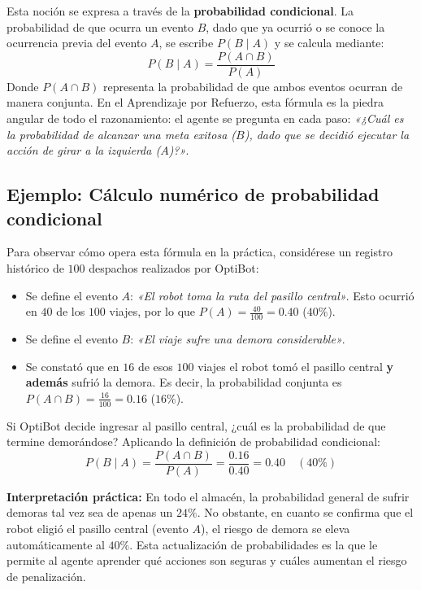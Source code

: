 Esta noción se expresa a través de la \textbf{probabilidad condicional}. La probabilidad de que ocurra un evento $B$, dado que ya ocurrió o se conoce la ocurrencia previa del evento $A$, se escribe $P(B \mid A)$ y se calcula mediante:
\begin{equation}
  P(B \mid A) = \frac{P(A \cap B)}{P(A)}
\end{equation}
Donde $P(A \cap B)$ representa la probabilidad de que ambos eventos ocurran de manera conjunta. En el Aprendizaje por Refuerzo, esta fórmula es la piedra angular de todo el razonamiento: el agente se pregunta en cada paso: \textit{«¿Cuál es la probabilidad de alcanzar una meta exitosa ($B$), dado que se decidió ejecutar la acción de girar a la izquierda ($A$)?»}.

\subsection*{Ejemplo: Cálculo numérico de probabilidad condicional}
Para observar cómo opera esta fórmula en la práctica, considérese un registro histórico de $100$ despachos realizados por OptiBot:
\begin{itemize}
  \item Se define el evento $A$: \textit{«El robot toma la ruta del pasillo central»}. Esto ocurrió en $40$ de los $100$ viajes, por lo que $P(A) = \frac{40}{100} = 0.40$ ($40\%$).
  \item Se define el evento $B$: \textit{«El viaje sufre una demora considerable»}.
  \item Se constató que en $16$ de esos $100$ viajes el robot tomó el pasillo central \textbf{y además} sufrió la demora. Es decir, la probabilidad conjunta es $P(A \cap B) = \frac{16}{100} = 0.16$ ($16\%$).
\end{itemize}

Si OptiBot decide ingresar al pasillo central, ¿cuál es la probabilidad de que termine demorándose? Aplicando la definición de probabilidad condicional:
\begin{equation*}
  P(B \mid A) = \frac{P(A \cap B)}{P(A)} = \frac{0.16}{0.40} = 0.40 \quad (40\%)
\end{equation*}

\textbf{Interpretación práctica:} En todo el almacén, la probabilidad general de sufrir demoras tal vez sea de apenas un $24\%$. No obstante, en cuanto se confirma que el robot eligió el pasillo central (evento $A$), el riesgo de demora se eleva automáticamente al $40\%$. Esta actualización de probabilidades es la que le permite al agente aprender qué acciones son seguras y cuáles aumentan el riesgo de penalización.

